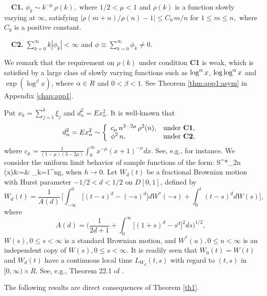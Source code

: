\noindent
\ \ \textbf{C1.} $\phi _{k}\sim k^{-\mu }\,\rho(k),$ where $1/2<\mu <1$ and $
\rho(k)$ is a function slowly varying at $\infty $, satisfying
$
|\rho(m+n)/\rho(n)-1| \le C_0\, m/n$ for $1\le m\le n,$
where $C_0$ is a positive constant.

\noindent
\ \ \textbf{C2.} $\sum_{k=0}^{\infty }k |\phi _{k}|<\infty $ and $\phi \equiv
\sum_{k=0}^{\infty }\phi_{k}\not =0$.

\noindent We remark that the requirement on $\rho(k)$ under condition {\bf C1} is weak,
which is satisfied by a large class of slowly varying functions such as $\log^{\alpha}x$,
$\log\log^{\alpha}x$ and $\exp(\log ^{\beta}x)$, where $\alpha\in R$ and $0<\beta<1$. See Theorem \ref{thm:app1:asym} in Appendix \ref{chap:app1}.

Put $x_{k}=\sum_{j=1}^{k}\xi _{j}$ and $d_n^2=Ex_n^2$.
It is well-known that
 \begin{equation}
 d_n^2=Ex_{n}^{2}\sim \left\{
\begin{array}{ll}
c_{\mu }\,n^{3-2\mu }\,\rho ^{2}(n), & \mbox{under {\bf C1}}, \\
\phi ^{2}\,n, & \mbox{under {\bf C2},}%
\end{array}%
\right. \la {ni1}
\end{equation}
where   $c_{\mu
}=\frac{1}{(1-\mu )(3-2\mu )}\int_{0}^{\infty }x^{-\mu }(x+1)^{-\mu
}dx$.
See, e.g.,  \cite{wanglingulati2003a} for instance.
 We consider the uniform limit behavior of sample functions of the form:
 \be
S^*_{2n} (x)&=&  \sum_{k=1}^{n}g\big[h^{-1}\,(x_{k}+x\, d_n)
\big],
\ee when $h\to 0$.  Let $W_{d }(t)$  be a fractional Brownian motion with Hurst parameter $-1/2<d<1/2$ on $D[0,1]$, defined by
\begin{equation*}
W_{d}(t)=\frac{1}{A(d)}\,\big[ \int_{-\infty }^{0}\Big[(t-s)^{d}-(-s)^{d}\Big]dW^*(-s)+\int_{0}^{t}(t-s)^{d}dW(s)\big],
\end{equation*}%
where
\begin{equation*}
A(d)=\Big (\frac{1}{2d+1 }+\int_{0}^{\infty }\Big[(1+s)^{d}-s^{d}\Big]^{2}ds\Big)^{1/2},
\end{equation*}%
$W(s), 0\leq s<\infty $ is a standard Brownian motion, and
$W^{\ast }(u),0\leq u<\infty $ is an independent copy of $W(s),
0\leq s<\infty $. It is readily
seen that $W_{0}(t)=W(t)$ and $W_{d}(t)$ have a continuous local time $%
L_{W_{d}}(t,s)$ with regard to $(t,s)$ in $[0,\infty )\times R$. See,
e.g., Theorem 22.1 of \cite{gemanhorowitz1980}.

The following results are direct consequences of Theorem \ref {th1}.


